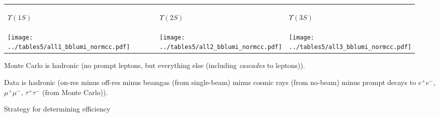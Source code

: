 \documentclass[landscape]{article}
\begin{document}
\huge
\renewcommand{\labelitemi}{-}
\setlength{\parindent}{0 cm}

\begin{tabular}{p{0.45\linewidth} p{0.25\linewidth} p{0.25\linewidth}}
  \begin{center} $\Upsilon(1S)$ \end{center} & \begin{center} $\Upsilon(2S)$ \end{center} & \begin{center} $\Upsilon(3S)$ \end{center} \\
  \begin{minipage}{\linewidth}
    \texttt{[image: ../tables5/all1\_bblumi\_normcc.pdf]}
  \end{minipage} &
  \begin{minipage}{\linewidth}
    \texttt{[image: ../tables5/all2\_bblumi\_normcc.pdf]}
  \end{minipage} &
  \begin{minipage}{\linewidth}
    \texttt{[image: ../tables5/all3\_bblumi\_normcc.pdf]}
  \end{minipage} \\
\end{tabular}

\vfill

Monte Carlo is hadronic (no prompt leptons, but everything else
(including {\it cascades} to leptons)).

\vfill

Data is hadronic (on-res minus off-res minus beamgas (from
single-beam) minus cosmic rays (from no-beam) minus prompt decays to
$e^+e^-$, $\mu^+\mu^-$, $\tau^+\tau^-$ (from Monte Carlo)).

\vfill

\pagebreak

Strategy for determining efficiency

\vfill
\end{document}
